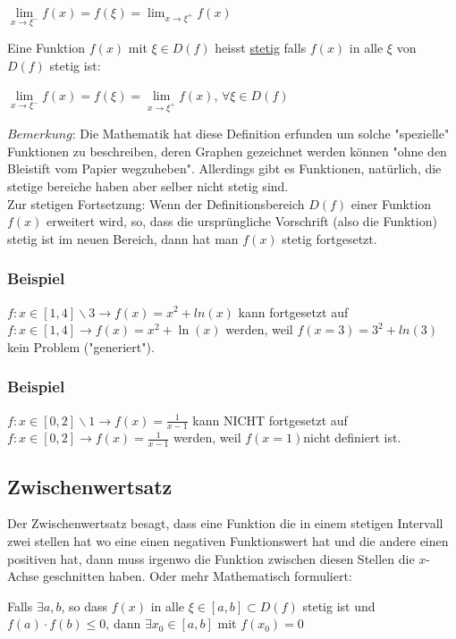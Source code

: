 \documentclass[11pt]{article} %
\begin{document}
\begin{center}
$\lim\limits_{x\rightarrow\xi^-}f(x) =f(\xi)= \lim_{x\rightarrow\xi^+}f(x)$ \\
\end{center}

Eine Funktion $f(x)$ mit $\xi \in D(f)$ heisst \underline{stetig} falls $f(x)$ in alle $\xi$ von $D(f)$ stetig ist:
\begin{center}
$\lim\limits_{x\rightarrow\xi^-}f(x) =f(\xi)= \lim\limits_{x\rightarrow\xi^+}f(x)$,  $\forall \xi \in D(f)$\\
\end{center}

$Bemerkung$: Die Mathematik hat diese Definition erfunden um solche "spezielle" Funktionen zu beschreiben, deren Graphen gezeichnet werden können "ohne den Bleistift vom Papier wegzuheben". Allerdings gibt es Funktionen, natürlich, die stetige bereiche haben aber selber nicht stetig sind.\\

Zur stetigen Fortsetzung: Wenn der Definitionsbereich $D(f)$ einer Funktion $f(x)$ erweitert wird, so, dass die ursprüngliche Vorschrift (also die Funktion) stetig ist im neuen Bereich, dann hat man $f(x)$ stetig fortgesetzt.

\subsubsection{Beispiel}
$f: x \in [1,4]\backslash{3} \rightarrow f(x) = x^2 + ln(x)$ kann fortgesetzt auf $f: x \in [1,4] \rightarrow f(x) = x^2 + \ln(x)$ werden, weil $f(x=3) = 3^2 + ln(3)$ kein Problem ("generiert").

\subsubsection{Beispiel}
$f: x \in [0,2]\backslash{1} \rightarrow f(x) = \frac{1}{x-1}$ kann NICHT fortgesetzt auf $f: x \in [0,2] \rightarrow f(x) = \frac{1}{x-1}$ werden, weil $f(x=1) $nicht definiert ist.
 
\subsection{Zwischenwertsatz}

Der Zwischenwertsatz besagt, dass eine Funktion die in einem stetigen Intervall zwei stellen hat wo eine einen negativen Funktionswert hat und die andere einen positiven hat, dann muss irgenwo die Funktion zwischen diesen Stellen die $x$-Achse geschnitten haben. Oder mehr Mathematisch formuliert: 
\begin{center}
Falls $\exists a,b$, so dass $f(x)$ in alle $\xi \in [a,b] \subset D(f)$ stetig ist und $f(a)\cdot f(b) \leq 0$, dann $\exists x_0 \in [a,b]$ mit $f(x_0)=0$
\end{center}
\end{document}
